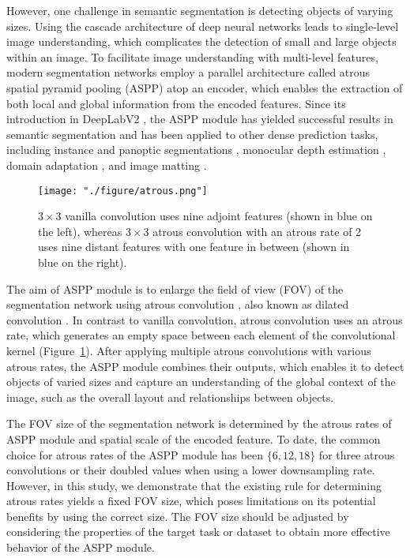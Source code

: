 \documentclass{article}
\def\figref#1{Figure~\ref{#1}}
\begin{document}
However, one challenge in semantic segmentation is detecting objects of varying sizes. Using the cascade architecture of deep neural networks leads to single-level image understanding, which complicates the detection of small and large objects within an image. To facilitate image understanding with multi-level features, modern segmentation networks employ a parallel architecture called atrous spatial pyramid pooling (ASPP) atop an encoder, which enables the extraction of both local and global information from the encoded features. Since its introduction in DeepLabV2 \citep{DBLP:journals/pami/ChenPKMY18}, the ASPP module has yielded successful results in semantic segmentation and has been applied to other dense prediction tasks, including instance \citep{DBLP:conf/cvpr/ChenPWXLSF0SOLL19} and panoptic segmentations \citep{DBLP:journals/corr/abs-2011-11675,DBLP:conf/cvpr/ChengCZ0HAC20}, monocular depth estimation \citep{DBLP:journals/corr/abs-1907-10326,DBLP:conf/cvpr/FuGWBT18}, domain adaptation \citep{DBLP:conf/mm/GaoZZT21,DBLP:conf/cvpr/GuoYLY21,DBLP:conf/ijcnn/MarsdenBDY22,DBLP:journals/tip/ZhengY22}, and image matting \citep{DBLP:conf/iccv/0003DSX19}.

\begin{figure}[t!]
	\centering
	\texttt{[image: "./figure/atrous.png"]}
	\caption{$3 \times 3$ vanilla convolution uses nine adjoint features (shown in blue on the left), whereas $3 \times 3$ atrous convolution with an atrous rate of 2 uses nine distant features with one feature in between (shown in blue on the right).}
	\label{fig:atrous}
\end{figure}

The aim of ASPP module is to enlarge the field of view (FOV) of the segmentation network using atrous convolution \citep{DBLP:journals/pami/ChenPKMY18}, also known as dilated convolution \citep{DBLP:conf/cvpr/YuKF17,DBLP:journals/corr/YuK15}. In contrast to vanilla convolution, atrous convolution uses an atrous rate, which generates an empty space between each element of the convolutional kernel (\figref{fig:atrous}). After applying multiple atrous convolutions with various atrous rates, the ASPP module combines their outputs, which enables it to detect objects of varied sizes and capture an understanding of the global context of the image, such as the overall layout and relationships between objects.

The FOV size of the segmentation network is determined by the atrous rates of ASPP module and spatial scale of the encoded feature. To date, the common choice for atrous rates of the ASPP module has been $\{6, 12, 18\}$ for three atrous convolutions or their doubled values when using a lower downsampling rate. However, in this study, we demonstrate that the existing rule for determining atrous rates yields a fixed FOV size, which poses limitations on its potential benefits by using the correct size. The FOV size should be adjusted by considering the properties of the target task or dataset to obtain more effective behavior of the ASPP module.
\end{document}
